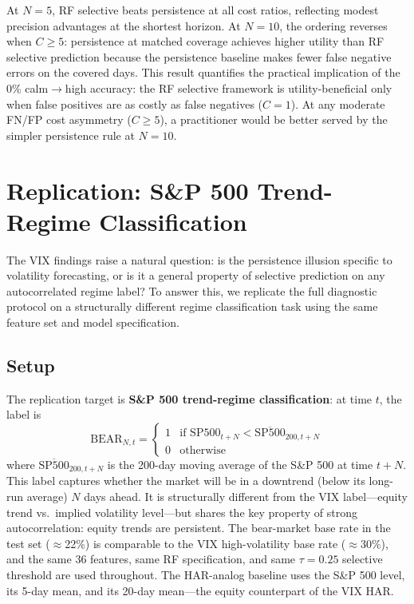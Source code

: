 \documentclass[12pt]{article}
\begin{document}
At $N = 5$, RF selective beats persistence at all cost ratios, reflecting modest precision advantages at the shortest horizon. At $N = 10$, the ordering reverses when $C \geq 5$: persistence at matched coverage achieves higher utility than RF selective prediction because the persistence baseline makes fewer false negative errors on the covered days. This result quantifies the practical implication of the 0\% calm$\to$high accuracy: the RF selective framework is utility-beneficial only when false positives are as costly as false negatives ($C = 1$). At any moderate FN/FP cost asymmetry ($C \geq 5$), a practitioner would be better served by the simpler persistence rule at $N = 10$.

\section{Replication: S\&P 500 Trend-Regime Classification}
\label{sec:replication}

The VIX findings raise a natural question: is the persistence illusion specific to volatility forecasting, or is it a general property of selective prediction on any autocorrelated regime label? To answer this, we replicate the full diagnostic protocol on a structurally different regime classification task using the same feature set and model specification.

\subsection{Setup}

The replication target is \textbf{S\&P 500 trend-regime classification}: at time $t$, the label is
\begin{equation}
    \text{BEAR}_{N,t} = \begin{cases} 1 & \text{if } \text{SP500}_{t+N} < \overline{\text{SP500}}_{200,t+N} \\ 0 & \text{otherwise} \end{cases}
\end{equation}
where $\overline{\text{SP500}}_{200,t+N}$ is the 200-day moving average of the S\&P 500 at time $t + N$. This label captures whether the market will be in a downtrend (below its long-run average) $N$ days ahead. It is structurally different from the VIX label---equity trend vs.\ implied volatility level---but shares the key property of strong autocorrelation: equity trends are persistent. The bear-market base rate in the test set ($\approx$22\%) is comparable to the VIX high-volatility base rate ($\approx$30\%), and the same 36 features, same RF specification, and same $\tau = 0.25$ selective threshold are used throughout. The HAR-analog baseline uses the S\&P 500 level, its 5-day mean, and its 20-day mean---the equity counterpart of the VIX HAR.
\end{document}
